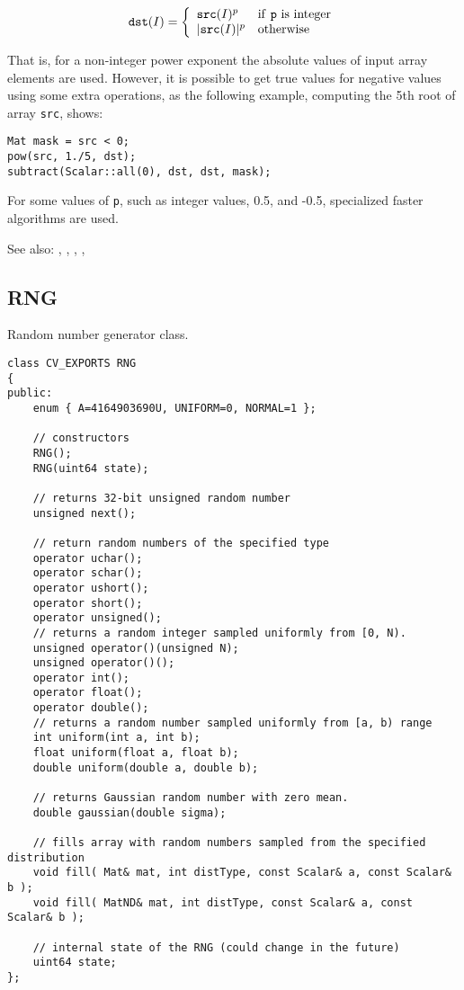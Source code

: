 \[
\texttt{dst}(I) = \left\{ \begin{array}{l l} \texttt{src}(I)^p & \mbox{if \texttt{p} is integer}\\ |\texttt{src}(I)|^p & \mbox{otherwise}\\ \end{array} \right.
\]

That is, for a non-integer power exponent the absolute values of input array elements are used. However, it is possible to get true values for negative values using some extra operations, as the following example, computing the 5th root of array \texttt{src}, shows:

\begin{lstlisting}
Mat mask = src < 0;
pow(src, 1./5, dst);
subtract(Scalar::all(0), dst, dst, mask);
\end{lstlisting}

For some values of \texttt{p}, such as integer values, 0.5, and -0.5, specialized faster algorithms are used.

See also: , , , , 


\subsection{RNG}\label{RNG}

Random number generator class.

\begin{lstlisting}
class CV_EXPORTS RNG
{
public:
    enum { A=4164903690U, UNIFORM=0, NORMAL=1 };

    // constructors
    RNG();
    RNG(uint64 state);
    
    // returns 32-bit unsigned random number
    unsigned next();

    // return random numbers of the specified type
    operator uchar();
    operator schar();
    operator ushort();
    operator short();
    operator unsigned();
	// returns a random integer sampled uniformly from [0, N).
	unsigned operator()(unsigned N);
	unsigned operator()();
    operator int();
    operator float();
    operator double();
    // returns a random number sampled uniformly from [a, b) range
    int uniform(int a, int b);
    float uniform(float a, float b);
    double uniform(double a, double b);
    
    // returns Gaussian random number with zero mean.
	double gaussian(double sigma);
    
    // fills array with random numbers sampled from the specified distribution
    void fill( Mat& mat, int distType, const Scalar& a, const Scalar& b );
    void fill( MatND& mat, int distType, const Scalar& a, const Scalar& b );

    // internal state of the RNG (could change in the future)
    uint64 state;
};
\end{lstlisting}

